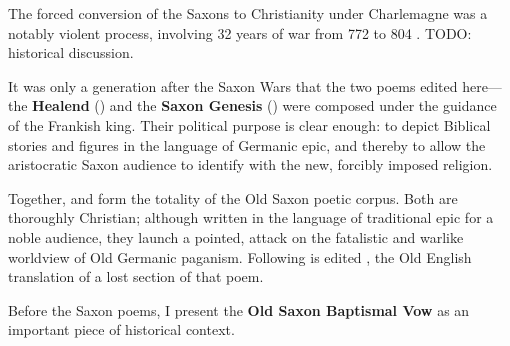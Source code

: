 
The forced conversion of the Saxons to Christianity under Charlemagne was a notably violent process, involving 32 years of war from 772 to 804 \ce.  TODO: historical discussion.

It was only a generation after the Saxon Wars that the two poems edited here---the \textbf{Healend} (\Heliand) and the \textbf{Saxon Genesis} (\SaxonGenesis) were composed under the guidance of the Frankish king.  Their political purpose is clear enough: to depict Biblical stories and figures in the language of Germanic epic, and thereby to allow the aristocratic Saxon audience to identify with the new, forcibly imposed religion.

Together,  and  form the totality of the Old Saxon poetic corpus.  Both are thoroughly Christian; although written in the language of traditional epic for a noble audience, they launch a pointed, attack on the fatalistic and warlike worldview of Old Germanic paganism.  Following  is edited , the Old English translation of a lost section of that poem.

Before the Saxon poems, I present the \textbf{Old Saxon Baptismal Vow} as an important piece of historical context.

\sectionline
